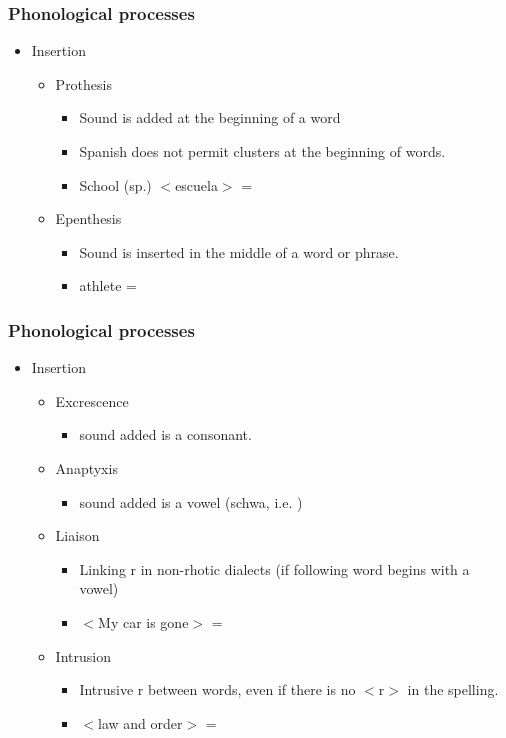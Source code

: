 \documentclass[12pt, table]{beamer}
\begin{document}
\begin{frame}
\frametitle{Phonological processes}
\begin{itemize}
\item Insertion
\begin{itemize}
\item Prothesis 
\begin{itemize}
\item Sound is added at the beginning of a word
\item Spanish does not permit  clusters at the beginning of words.
\item School (sp.) $<$escuela$>$ = \textipa{[eskwel2]}	
\end{itemize}
\item Epenthesis 
\begin{itemize}
\item Sound is inserted in the middle of a word or phrase.
\item athlete = \textipa{[\ae T@li:t]}
\end{itemize}
\end{itemize}
\end{itemize}
\end{frame}

\begin{frame}
\frametitle{Phonological processes}
\begin{itemize}
\item Insertion
\begin{itemize}
\item Excrescence
\begin{itemize}
\item sound added is a consonant.
\end{itemize}
\item Anaptyxis
\begin{itemize}
\item sound added is a vowel (schwa, i.e. )
\end{itemize}
\item Liaison
\begin{itemize}
\item Linking r in non-rhotic dialects (if following word begins with a vowel)
\item $<$My car is gone$>$ = 
\end{itemize}
\item Intrusion
\begin{itemize}
\item Intrusive r between words, even if there is no $<$r$>$ in the spelling.
\item $<$law and order$>$ = \textipa{[lO:^{r}@nO:d@]}
\end{itemize}
\end{itemize}
\end{itemize}
\end{frame}
\end{document}
